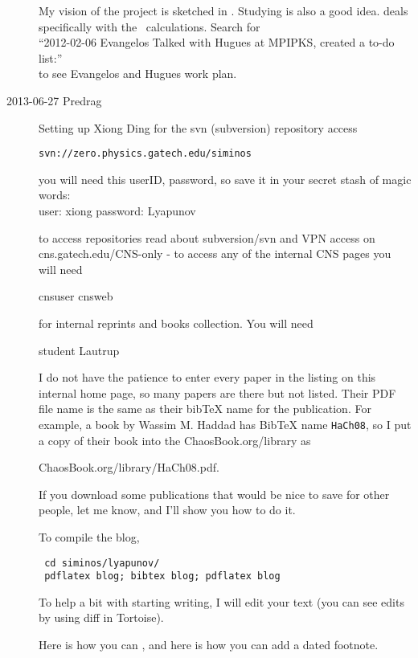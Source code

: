 \begin{description}
My vision of the project is sketched in . Studying
 is also a good idea. 
deals specifically with the \KS\ calculations.
Search for\\
``2012-02-06 Evangelos Talked with Hugues at MPIPKS, created a to-do list:''
\\
to see Evangelos and Hugues work plan.

\item[2013-06-27 Predrag]
Setting up Xiong Ding for the svn (subversion) repository access

\texttt{svn://zero.physics.gatech.edu/siminos}

you will
need this userID, password, so save it in your secret stash of magic
words:
\\
user: xiong  password: Lyapunov

to access repositories read about subversion/svn and VPN access on
 {cns.gatech.edu/CNS-only} - to
access any of the internal CNS pages you will need

cnsuser           cnsweb

 for internal reprints and
books collection. You will need

student           Lautrup

I do not have the patience to enter every paper in the listing on this
internal home page, so many papers are there but not listed. Their PDF
file name is the same as their bibTeX name for the publication. For
example, a book by Wassim M. Haddad has BibTeX name
\texttt{HaCh08}, so I put a copy of their book into the
ChaosBook.org/library as

{ChaosBook.org/library/HaCh08.pdf}.

If you download some publications that would be nice to save for other
people, let me know, and I'll show you how to do it.

To compile the blog,
\begin{verbatim}
 cd siminos/lyapunov/
 pdflatex blog; bibtex blog; pdflatex blog
\end{verbatim}

To help a bit with starting writing, I will
edit your text (you can see edits by using diff in Tortoise).

Here is how you can
, and here is how you can add a dated
footnote.


\end{description}
